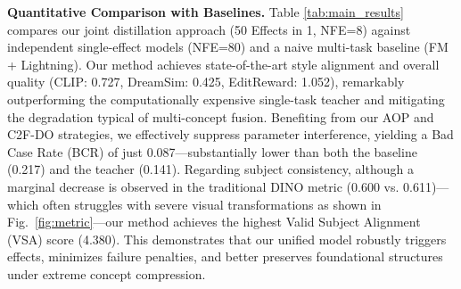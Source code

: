 \documentclass{llmxive}
\begin{document}
\begin{table}[!t]
\centering
{}
\vspace{-0.3cm}
\caption{Deployment costs across numbers of LoRAs.}
\label{tab:deploy_cost}
\end{table}

\textbf{Quantitative Comparison with Baselines.}
Table \ref{tab:main_results} compares our joint distillation approach (50 Effects in 1, NFE=8) against independent single-effect models (NFE=80) and a naive multi-task baseline (FM + Lightning). Our method achieves state-of-the-art style alignment and overall quality (CLIP: 0.727, DreamSim: 0.425, EditReward: 1.052), remarkably outperforming the computationally expensive single-task teacher and mitigating the degradation typical of multi-concept fusion. Benefiting from our AOP and C2F-DO strategies, we effectively suppress parameter interference, yielding a Bad Case Rate (BCR) of just 0.087—substantially lower than both the baseline (0.217) and the teacher (0.141). Regarding subject consistency, although a marginal decrease is observed in the traditional DINO metric (0.600 vs. 0.611)—which often struggles with severe visual transformations as shown in Fig.~\ref{fig:metric}—our method achieves the highest Valid Subject Alignment (VSA) score (4.380). This demonstrates that our unified model robustly triggers effects, minimizes failure penalties, and better preserves foundational structures under extreme concept compression.
\end{document}
